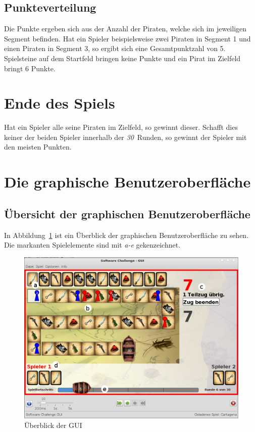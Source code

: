 \documentclass[a4paper, ngerman]{scrartcl}
\newcommand{\RundenAnzahl}{\emph{30}}
\begin{document}
	\subsection{Punkteverteilung}
	Die Punkte ergeben sich aus der Anzahl der Piraten, welche sich im jeweiligen
	Segment befinden. Hat ein Spieler beispielsweise zwei Piraten in Segment 1 und
	einen Piraten in Segment 3, so ergibt sich eine Gesamtpunktzahl von 5.\\
	Spielsteine auf dem Startfeld bringen keine Punkte und ein Pirat im Zielfeld
	bringt 6 Punkte.
	
\section{Ende des Spiels}

	Hat ein Spieler alle seine Piraten im Zielfeld, so gewinnt dieser. Schafft dies
	keiner der beiden Spieler innerhalb der \RundenAnzahl\ Runden, so
	gewinnt der Spieler mit den meisten Punkten.
	
\section{Die graphische Benutzeroberfläche}
\subsection{Übersicht der graphischen Benutzeroberfläche}
	In Abbildung~\ref{fig:GUI} ist ein Überblick der graphischen Benutzeroberfläche
	zu sehen. Die markanten Spielelemente sind mit \emph{a-e} gekenzeichnet.
	
	 \begin{figure}[h!]
		\centering		
		\includegraphics[scale = 0.3]{bilder/gui}
		\caption{Überblick der GUI}
		\label{fig:GUI}
	\end{figure}
	
\end{document}
